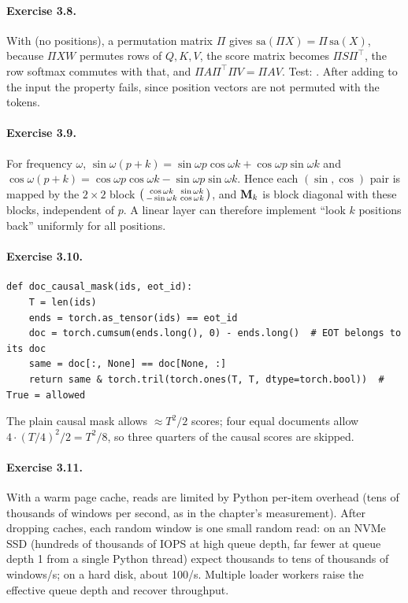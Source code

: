 \paragraph{Exercise 3.8.} With  (no positions), a permutation
matrix $\Pi$ gives $\mathrm{sa}(\Pi X)=\Pi\,\mathrm{sa}(X)$, because $\Pi X W$ permutes rows of $Q,K,V$,
the score matrix becomes $\Pi S\Pi^\top$, the row softmax commutes with that, and
$\Pi A\Pi^\top\Pi V=\Pi AV$. Test: .
After adding  to the input the property fails, since position vectors are not
permuted with the tokens.

\paragraph{Exercise 3.9.} For frequency $\omega$, $\sin\omega(p+k)=\sin\omega p\cos\omega k+\cos\omega p\sin\omega k$ and
$\cos\omega(p+k)=\cos\omega p\cos\omega k-\sin\omega p\sin\omega k$. Hence each $(\sin,\cos)$ pair is mapped by the
$2\times2$ block $\begin{psmallmatrix}\cos\omega k&\sin\omega k\\-\sin\omega k&\cos\omega k\end{psmallmatrix}$, and $\mathbf{M}_k$ is block
diagonal with these blocks, independent of $p$. A linear layer can therefore implement ``look $k$
positions back'' uniformly for all positions.

\paragraph{Exercise 3.10.}
\begin{lstlisting}
def doc_causal_mask(ids, eot_id):
    T = len(ids)
    ends = torch.as_tensor(ids) == eot_id
    doc = torch.cumsum(ends.long(), 0) - ends.long()  # EOT belongs to its doc
    same = doc[:, None] == doc[None, :]
    return same & torch.tril(torch.ones(T, T, dtype=torch.bool))  # True = allowed
\end{lstlisting}
The plain causal mask allows $\approx T^2/2$ scores; four equal documents allow
$4\cdot(T/4)^2/2=T^2/8$, so three quarters of the causal scores are skipped.

\paragraph{Exercise 3.11.} With a warm page cache, reads are limited by Python per-item overhead
(tens of thousands of windows per second, as in the chapter's measurement). After dropping caches,
each random window is one small random read: on an NVMe SSD (hundreds of thousands of IOPS at high
queue depth, far fewer at queue depth 1 from a single Python thread) expect thousands to tens of
thousands of windows/s; on a hard disk, about 100/s. Multiple loader workers raise the effective
queue depth and recover throughput.
